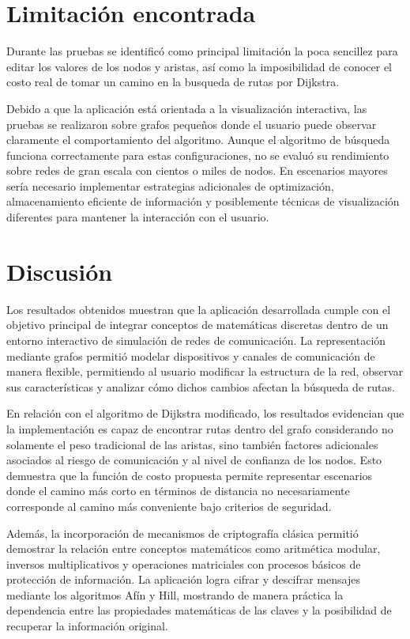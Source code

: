 \documentclass[conference]{IEEEtran}
\begin{document}
\section{Limitación encontrada}
Durante las pruebas se identificó como principal limitación la poca sencillez para editar los valores de los nodos y aristas, así como la imposibilidad de conocer el costo real de tomar un camino en la busqueda de rutas por Dijkstra. 

Debido a que la aplicación está orientada a la visualización interactiva, las pruebas se realizaron sobre grafos pequeños donde el usuario puede observar claramente el comportamiento del algoritmo. Aunque el algoritmo de búsqueda funciona correctamente para estas configuraciones, no se evaluó su rendimiento sobre redes de gran escala con cientos o miles de nodos. En escenarios mayores sería necesario implementar estrategias adicionales de optimización, almacenamiento eficiente de información y posiblemente técnicas de visualización diferentes para mantener la interacción con el usuario.

\section{Discusión}
Los resultados obtenidos muestran que la aplicación desarrollada cumple con el objetivo principal de integrar conceptos de matemáticas discretas dentro de un entorno interactivo de simulación de redes de comunicación. La representación mediante grafos permitió modelar dispositivos y canales de comunicación de manera flexible, permitiendo al usuario modificar la estructura de la red, observar sus características y analizar cómo dichos cambios afectan la búsqueda de rutas.

En relación con el algoritmo de Dijkstra modificado, los resultados evidencian que la implementación es capaz de encontrar rutas dentro del grafo considerando no solamente el peso tradicional de las aristas, sino también factores adicionales asociados al riesgo de comunicación y al nivel de confianza de los nodos. Esto demuestra que la función de costo propuesta permite representar escenarios donde el camino más corto en términos de distancia no necesariamente corresponde al camino más conveniente bajo criterios de seguridad.

Además, la incorporación de mecanismos de criptografía clásica permitió demostrar la relación entre conceptos matemáticos como aritmética modular, inversos multiplicativos y operaciones matriciales con procesos básicos de protección de información. La aplicación logra cifrar y descifrar mensajes mediante los algoritmos Afín y Hill, mostrando de manera práctica la dependencia entre las propiedades matemáticas de las claves y la posibilidad de recuperar la información original.
\end{document}
